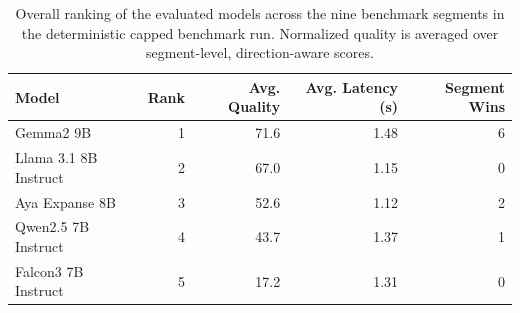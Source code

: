 \begin{table}[t]
\centering
\caption{Overall ranking of the evaluated models across the nine benchmark segments in the deterministic capped benchmark run. Normalized quality is averaged over segment-level, direction-aware scores.}
\label{tab:capped-overall-ranking}
\begin{tabular}{lrrrr}
\toprule
Model & Rank & Avg. Quality & Avg. Latency (s) & Segment Wins \\
\midrule
Gemma2 9B & 1 & 71.6 & 1.48 & 6 \\
Llama 3.1 8B Instruct & 2 & 67.0 & 1.15 & 0 \\
Aya Expanse 8B & 3 & 52.6 & 1.12 & 2 \\
Qwen2.5 7B Instruct & 4 & 43.7 & 1.37 & 1 \\
Falcon3 7B Instruct & 5 & 17.2 & 1.31 & 0 \\
\bottomrule
\end{tabular}
\end{table}
